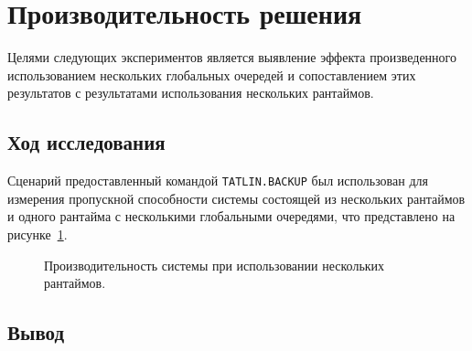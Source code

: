 \section{Производительность решения}

Целями следующих экспериментов является выявление эффекта произведенного использованием нескольких глобальных очередей и сопоставлением этих результатов с результатами использования нескольких рантаймов.

\subsection{Ход исследования}

Сценарий предоставленный командой \verb|TATLIN.BACKUP| был использован для измерения пропускной способности системы состоящей из нескольких рантаймов и одного рантайма с несколькими глобальными очередями, что представлено на рисунке~\ref{fig:tatlin:multi_rt_gp:eval}.

\begin{figure}[H]
    \begin{center}
    \end{center}

    \caption{Производительность системы при использовании нескольких рантаймов.}
    \label{fig:tatlin:multi_rt_gp:eval}
\end{figure}

\subsection{Вывод}

